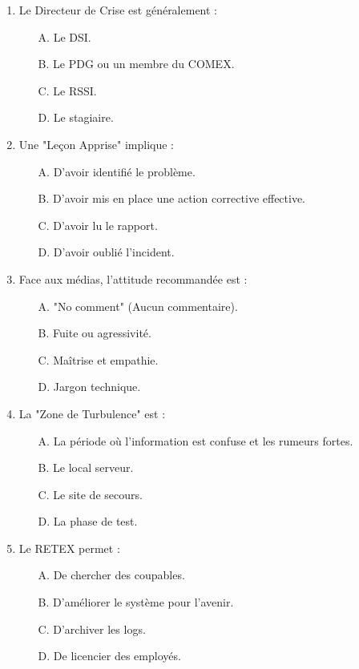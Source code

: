 \begin{enumerate}
    \item Le Directeur de Crise est généralement :
    \begin{itemize}
        \item[A.] Le DSI.
        \item[B.] Le PDG ou un membre du COMEX.
        \item[C.] Le RSSI.
        \item[D.] Le stagiaire.
    \end{itemize}

    \item Une "Leçon Apprise" implique :
    \begin{itemize}
        \item[A.] D'avoir identifié le problème.
        \item[B.] D'avoir mis en place une action corrective effective.
        \item[C.] D'avoir lu le rapport.
        \item[D.] D'avoir oublié l'incident.
    \end{itemize}

    \item Face aux médias, l'attitude recommandée est :
    \begin{itemize}
        \item[A.] "No comment" (Aucun commentaire).
        \item[B.] Fuite ou agressivité.
        \item[C.] Maîtrise et empathie.
        \item[D.] Jargon technique.
    \end{itemize}

    \item La "Zone de Turbulence" est :
    \begin{itemize}
        \item[A.] La période où l'information est confuse et les rumeurs fortes.
        \item[B.] Le local serveur.
        \item[C.] Le site de secours.
        \item[D.] La phase de test.
    \end{itemize}

    \item Le RETEX permet :
    \begin{itemize}
        \item[A.] De chercher des coupables.
        \item[B.] D'améliorer le système pour l'avenir.
        \item[C.] D'archiver les logs.
        \item[D.] De licencier des employés.
    \end{itemize}


\end{enumerate}
